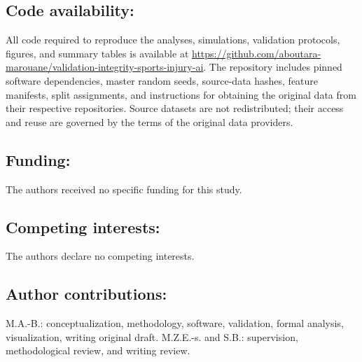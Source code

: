 \documentclass[11pt,a4paper]{article}
\begin{document}
\subsection*{Code availability:} All code required to reproduce the analyses, simulations, validation protocols, figures, and summary tables is available at \href{https://github.com/aboutara-marouane/validation-integrity-sports-injury-ai}{https://github.com/aboutara-marouane/validation-integrity-sports-injury-ai}. The repository includes pinned software dependencies, master random seeds, source-data hashes, feature manifests, split assignments, and instructions for obtaining the original data from their respective repositories. Source datasets are not redistributed; their access and reuse are governed by the terms of the original data providers.

\subsection*{Funding:} The authors received no specific funding for this study.

\subsection*{Competing interests:} The authors declare no competing interests.

\subsection*{Author contributions:} M.A.-B.: conceptualization, methodology, software, validation, formal analysis, visualization, writing original draft. M.Z.E.-s. and S.B.: supervision, methodological review, and writing review.


\newpage


\end{document}
